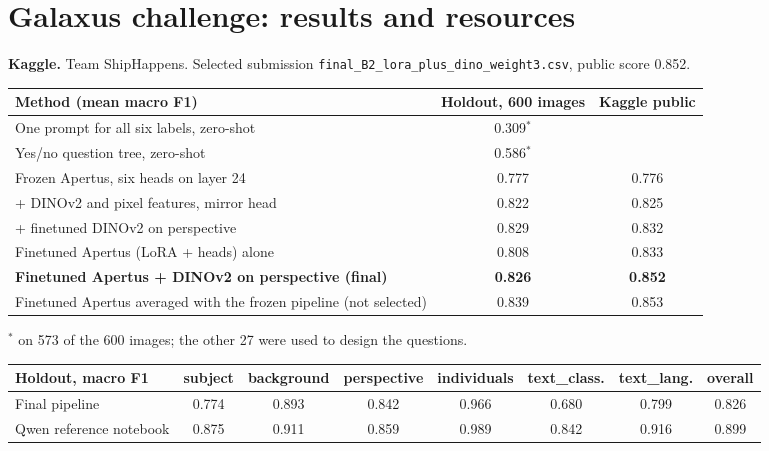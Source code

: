 \documentclass[10pt,a4paper]{article}
\newcommand{\code}[1]{\texttt{#1}}
\begin{document}
\section{Galaxus challenge: results and resources}

\textbf{Kaggle.} Team ShipHappens. Selected submission \code{final\_B2\_lora\_plus\_dino\_weight3.csv}, public score
0.852.

\begin{center}
\begin{tabular}{lcc}
\toprule
Method (mean macro F1) & Holdout, 600 images & Kaggle public \\
\midrule
One prompt for all six labels, zero-shot & 0.309$^{*}$ & \\
Yes/no question tree, zero-shot & 0.586$^{*}$ & \\
Frozen Apertus, six heads on layer 24 & 0.777 & 0.776 \\
\quad + DINOv2 and pixel features, mirror head & 0.822 & 0.825 \\
\quad + finetuned DINOv2 on perspective & 0.829 & 0.832 \\
Finetuned Apertus (LoRA + heads) alone & 0.808 & 0.833 \\
\textbf{Finetuned Apertus + DINOv2 on perspective (final)} & \textbf{0.826} & \textbf{0.852} \\
Finetuned Apertus averaged with the frozen pipeline (not selected) & 0.839 & 0.853 \\
\bottomrule
\end{tabular}

{\footnotesize $^{*}$ on 573 of the 600 images; the other 27 were used to design the questions.}
\end{center}

\begin{center}
\small\setlength{\tabcolsep}{4.5pt}
\begin{tabular}{lccccccc}
\toprule
Holdout, macro F1 & subject & background & perspective & individuals & text\_class. & text\_lang. & overall \\
\midrule
Final pipeline & 0.774 & 0.893 & 0.842 & 0.966 & 0.680 & 0.799 & 0.826 \\
Qwen reference notebook & 0.875 & 0.911 & 0.859 & 0.989 & 0.842 & 0.916 & 0.899 \\
\bottomrule
\end{tabular}
\end{center}
\end{document}
